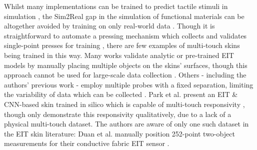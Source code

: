 Whilst many implementations can be trained to predict tactile stimuli in simulation \cite{Park2022, Park2020ERT}, the Sim2Real gap in the simulation of functional materials can be altogether avoided by training on only real-world data \cite{Howison2021, hardman2023tactile}. Though it is straightforward to automate a pressing mechanism which collects and validates single-point presses for training \cite{TerrynLearning, Hardman20223D}, there are few examples of multi-touch skins being trained in this way. Many works validate analytic or pre-trained EIT models by manually placing multiple objects on the skins' surfaces, though this approach cannot be used for large-scale data collection \cite{Zhang2023, Soleimani2022Ionic, Zheng2018}. Others - including the authors' previous work - employ multiple probes with a fixed separation, limiting the variability of data which can be collected \cite{hardman2023tactile, Chen2023Novel, Jamshidi2023EIT}. Park et al. present an EIT \& CNN-based skin trained in silico which is capable of multi-touch responsivity \cite{Park2022}, though only demonstrate this responsivity qualitatively, due to a lack of a physical multi-touch dataset. The authors are aware of only one such dataset in the EIT skin literature: Duan et al. manually position 252-point two-object measurements for their conductive fabric EIT sensor \cite{Duan2019}.

